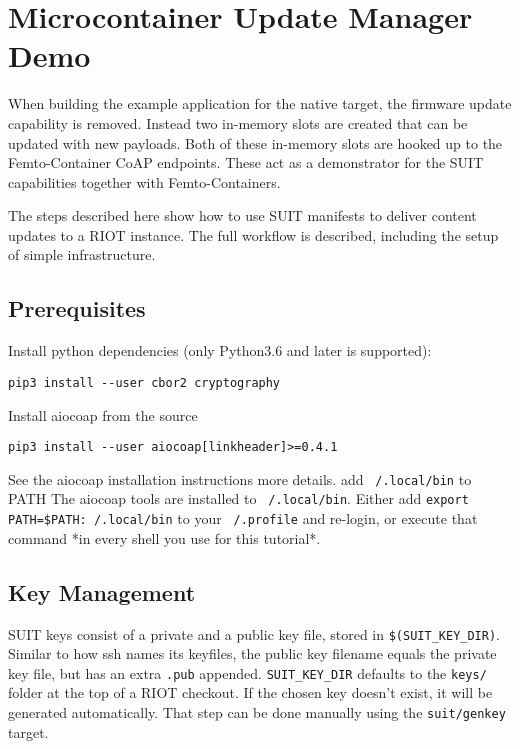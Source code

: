 \documentclass[../main.tex]{subfiles}
\begin{document}
	

\section{Microcontainer Update Manager Demo}

When building the example application for the native target, the firmware update
capability is removed. Instead two in-memory slots are created that can be
updated with new payloads. Both of these in-memory slots are hooked up to the
Femto-Container CoAP endpoints. These act as a demonstrator for the SUIT
capabilities together with Femto-Containers.

The steps described here show how to use SUIT manifests to deliver content
updates to a RIOT instance. The full workflow is described, including the setup
of simple infrastructure.

\subsection{Prerequisites}

Install python dependencies (only Python3.6 and later is supported):

\begin{lstlisting}
pip3 install --user cbor2 cryptography
\end{lstlisting}

Install aiocoap from the source

\begin{lstlisting}
pip3 install --user aiocoap[linkheader]>=0.4.1
\end{lstlisting}

See the aiocoap installation instructions
more details.  add \texttt{~/.local/bin} to PATH The aiocoap tools are
installed to \texttt{~/.local/bin}. Either add \texttt{export
PATH=\$PATH:~/.local/bin} to your \texttt{~/.profile} and re-login, or execute
that command *in every shell you use for this tutorial*.
	
\subsection{Key Management}

SUIT keys consist of a private and a public key file, stored in \texttt{\$(SUIT\_KEY\_DIR)}.
Similar to how ssh names its keyfiles, the public key filename equals the
private key file, but has an extra \texttt{.pub} appended.
\texttt{SUIT\_KEY\_DIR} defaults to the \texttt{keys/} folder at the top of a RIOT checkout.
If the chosen key doesn't exist, it will be generated automatically.
That step can be done manually using the \texttt{suit/genkey} target.
\end{document}
